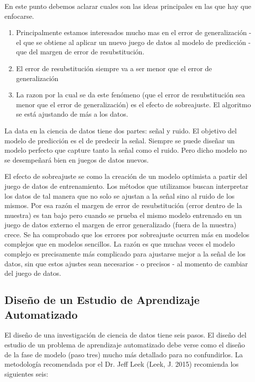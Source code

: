 \documentclass[letterpaper, spanish, 11pt]{report}
\begin{document}
En este punto debemos aclarar cuales son las ideas principales en las que hay que enfocarse. 

\begin{enumerate}
	\item Principalmente estamos interesados mucho mas en el error de generalización - el que se obtiene al aplicar un nuevo juego de datos al modelo de predicción - que del margen de error de resubstitución.
	\item El error de resubstitución siempre va a ser menor que el error de generalización 
	\item La razon por la cual se da este fenómeno (que el error de resubstitución sea menor que el error de generalización) es el efecto de sobreajuste. El algoritmo se está ajustando de más a los datos.
\end{enumerate}

La data en la ciencia de datos tiene dos partes: señal y ruido. El objetivo del modelo de predicción es el de predecir la señal. Siempre se puede diseñar un modelo perfecto que capture tanto la señal como el ruido. Pero dicho modelo no se desempeñará bien en juegos de datos nuevos. 

El efecto de sobreajuste se como la creación de un modelo optimista a partir del juego de datos de entrenamiento. Los métodos que utilizamos buscan interpretar los datos de tal manera que no solo se ajustan a la señal sino al ruido de los mismos. Por esa razón el margen de error de resubstitución (error dentro de la muestra) es tan bajo pero cuando se prueba el mismo modelo entrenado en un juego de datos externo el margen de error generalizado (fuera de la muestra) crece. Se ha comprobado que los errores por sobreajuste ocurren más en modelos complejos que en modelos sencillos. La razón es que muchas veces el modelo complejo es precisamente más complicado para ajustarse mejor a la señal de los datos, sin que estos ajustes sean necesarios - o precisos - al momento de cambiar del juego de datos. 

\subsection{Diseño de un Estudio de Aprendizaje Automatizado}
El diseño de una investigación de ciencia de datos tiene seis pasos. El diseño del estudio de un problema de aprendizaje automatizado debe verse como el diseño de la fase de modelo (paso tres) mucho más detallado para no confundirlos. La metodología recomendada por el Dr. Jeff Leek (Leek, J. 2015) recomienda los siguientes seis:
\end{document}
